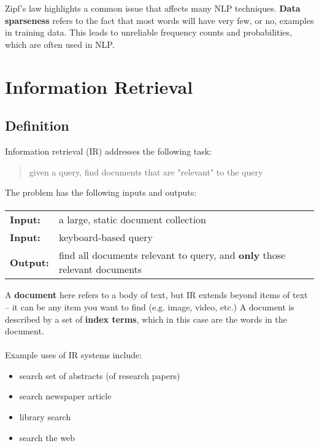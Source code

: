 \documentclass{article}
\begin{document}
Zipf's law highlights a common issue that affects many NLP techniques. \textbf{Data sparseness} refers to the fact that most words will have very few, or no, examples in training data. This leads to unreliable frequency counts and probabilities, which are often used in NLP.

\section{Information Retrieval}

\subsection{Definition}

Information retrieval (IR) addresses the following task:
\begin{quote}
	given a query, find documents that are "relevant" to the query
\end{quote}

The problem has the following inputs and outputs:
\paragraph{} \begin{tabular}{ll}
	\textbf{Input:} & a large, static document collection \\
	\textbf{Input:} & keyboard-based query \\
	\textbf{Output:} & find all documents relevant to query, and \textbf{only} those relevant documents \\
\end{tabular}

A \textbf{document} here refers to a body of text, but IR extends beyond items of text -- it can be any item you want to find (e.g. image, video, etc.) A document is described by a set of \textbf{index terms}, which in this case are the words in the document. 

\paragraph{}

Example uses of IR systems include:
\begin{itemize}
	\item search set of abstracts (of research papers)
	\item search newspaper article
	\item library search
	\item search the web
\end{itemize}
\end{document}

